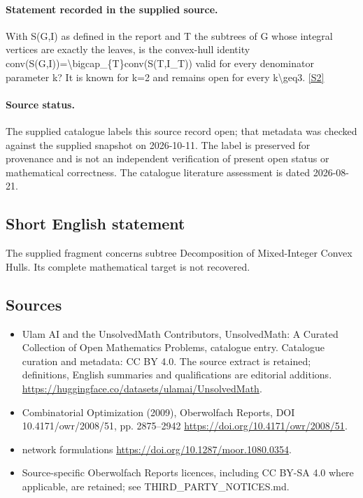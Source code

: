 \documentclass[11pt]{article}
\newcommand{\sref}[2]{\hyperlink{source:#1:#2}{[S#2]}}
\begin{document}
\paragraph{Statement recorded in the supplied source.}
With S(G,I) as defined in the report and T the subtrees of G whose integral vertices are exactly the leaves, is the convex-hull identity conv(S(G,I))=\textbackslash{}bigcap\_\{T\}conv(S(T,I\_T)) valid for every denominator parameter k? It is known for k=2 and remains open for every k\textbackslash{}geq3. \sref{statement}{2}
\paragraph{Source status.}
The supplied catalogue labels this source record open; that metadata was checked against the supplied snapshot on 2026-10-11. The label is preserved for provenance and is not an independent verification of present open status or mathematical correctness. The catalogue literature assessment is dated 2026-08-21.
\subsection{Short English statement}
The supplied fragment concerns subtree Decomposition of Mixed-Integer Convex Hulls. Its complete mathematical target is not recovered.
\subsection{Sources}
\begin{itemize}
\item[\hypertarget{source:statement:1}{S1}] Ulam AI and the UnsolvedMath Contributors, UnsolvedMath: A Curated Collection of Open Mathematics Problems, catalogue entry. Catalogue curation and metadata: CC BY 4.0. The source extract is retained; definitions, English summaries and qualifications are editorial additions.
\url{https://huggingface.co/datasets/ulamai/UnsolvedMath}.
\item[\hypertarget{source:statement:2}{S2}] Combinatorial Optimization (2009), Oberwolfach Reports, DOI 10.4171/owr/2008/51, pp. 2875--2942
\url{https://doi.org/10.4171/owr/2008/51}.
\item[\hypertarget{source:statement:3}{S3}] network formulations
\url{https://doi.org/10.1287/moor.1080.0354}.
\item Source-specific Oberwolfach Reports licences, including CC BY-SA 4.0 where applicable, are retained; see THIRD\_PARTY\_NOTICES.md.
\end{itemize}
\end{document}
